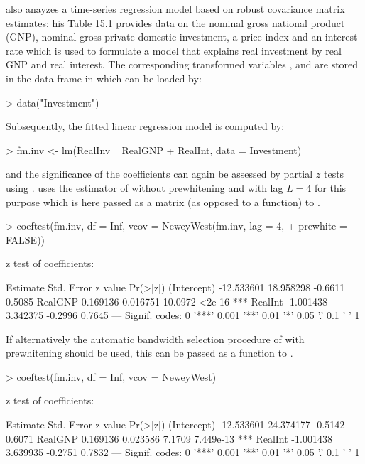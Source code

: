 \documentclass{Z}
\begin{document}
\cite{hac:Greene:1993} also anayzes a time-series regression model
based on robust covariance matrix estimates: his Table 15.1 provides
data on the nominal gross national product (GNP), nominal gross private
domestic investment, a price index and an interest rate which is used
to formulate a model that explains real investment by real GNP and real
interest. The corresponding transformed variables , 
and  are stored in the data frame  in
 which can be loaded by:
\begin{Schunk}
\begin{Sinput}
> data("Investment")
\end{Sinput}
\end{Schunk}
Subsequently, the fitted linear regression model is computed by:
\begin{Schunk}
\begin{Sinput}
> fm.inv <- lm(RealInv ~ RealGNP + RealInt, data = Investment)
\end{Sinput}
\end{Schunk}
and the significance of the coefficients can again be assessed
by partial $z$ tests using . \cite{hac:Greene:1993}
uses the estimator of \cite{hac:Newey+West:1987} without prewhitening and
with lag $L = 4$ for this purpose which is here passed as a matrix (as opposed to a function)
to .
\begin{Schunk}
\begin{Sinput}
> coeftest(fm.inv, df = Inf, vcov = NeweyWest(fm.inv, lag = 4, 
+     prewhite = FALSE))
\end{Sinput}
\begin{Soutput}
z test of coefficients:

              Estimate Std. Error z value Pr(>|z|)    
(Intercept) -12.533601  18.958298 -0.6611   0.5085    
RealGNP       0.169136   0.016751 10.0972   <2e-16 ***
RealInt      -1.001438   3.342375 -0.2996   0.7645    
---
Signif. codes:  0 '***' 0.001 '**' 0.01 '*' 0.05 '.' 0.1 ' ' 1 
\end{Soutput}
\end{Schunk}
If alternatively the automatic bandwidth selection procedure of \cite{hac:Newey+West:1994}
with prewhitening should be used, this can be passed as a function to .
\begin{Schunk}
\begin{Sinput}
> coeftest(fm.inv, df = Inf, vcov = NeweyWest)
\end{Sinput}
\begin{Soutput}
z test of coefficients:

              Estimate Std. Error z value  Pr(>|z|)    
(Intercept) -12.533601  24.374177 -0.5142    0.6071    
RealGNP       0.169136   0.023586  7.1709 7.449e-13 ***
RealInt      -1.001438   3.639935 -0.2751    0.7832    
---
Signif. codes:  0 '***' 0.001 '**' 0.01 '*' 0.05 '.' 0.1 ' ' 1 
\end{Soutput}
\end{Schunk}
\end{document}
